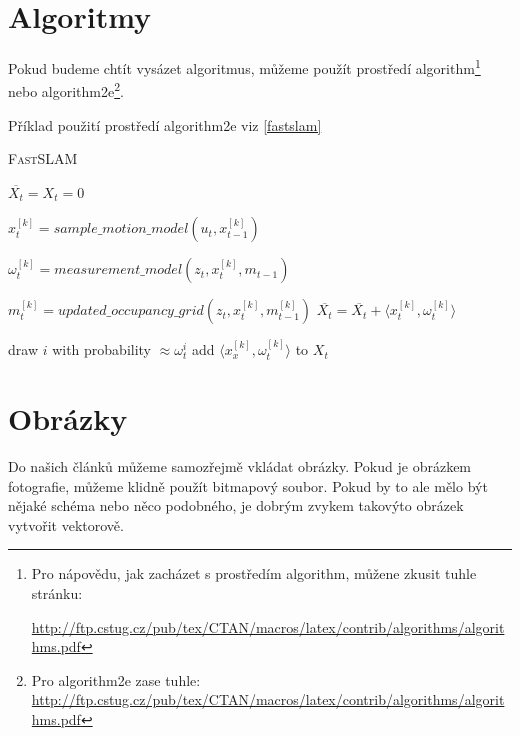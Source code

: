 \documentclass[a4paper,11pt,final]{article}
\begin{document}
\pagebreak



\section{Algoritmy}
\label{algos}

{\raggedright
Pokud budeme chtít vysázet algoritmus, můžeme použít prostředí {\ttfamily algorithm}\footnote{Pro nápovědu, jak zacházet s prostředím {\ttfamily algorithm}, můžene zkusit tuhle stránku: \raggedright{
\url{http://ftp.cstug.cz/pub/tex/CTAN/macros/latex/contrib/algorithms/algorithms.pdf}}} nebo {\ttfamily algorithm2e}\footnote{Pro {\ttfamily algorithm2e} zase tuhle: \url{http://ftp.cstug.cz/pub/tex/CTAN/macros/latex/contrib/algorithms/algorithms.pdf}}.
 
Příklad použití prostředí  {\ttfamily algorithm2e} viz \autoref{fastslam}}
\IncMargin{1.5em}
\begin{algorithm}[h]
	\caption{\textsc{FastSLAM}}
	\label{fastslam}
	\DontPrintSemicolon
	\SetAlgoLongEnd
	\SetAlgoNoLine
	\Indm\Indm
	\BlankLine
	\Indp\Indp
	$\overline{X_t} = X_t = 0$\;
	{
		$x^{[k]}_{t} = sample\_motion\_model(u_t,x_{t-1}^{[k]})$\;
		
		$\omega^{[k]}_{t} = measurement\_model(z_t,x^{[k]}_{t}, m_{t-1})$\;
		
		$m^{[k]}_{t} = updated\_occupancy\_grid(z_t, x^{[k]}_{t},m_{t-1}^{[k]})$\;
		$\overline{X_t} = \overline{X_t} + \langle x^{[k]}_{t}, \omega^{[k]}_{t} \rangle$
	}	
	{
		draw $i$ with probability $\approx \omega^{i}_t$\;
		add $\langle x^{[k]}_{x}, \omega^{[k]}_{t} \rangle$ to $X_t$\;
	}

\end{algorithm}
\DecMargin{1.5em}

\section{Obrázky}

Do našich článků můžeme samozřejmě vkládat obrázky. Pokud je obrázkem fotografie, můžeme klidně použít bitmapový soubor. Pokud by to ale mělo být nějaké schéma nebo něco podobného, je dobrým zvykem takovýto obrázek vytvořit vektorově.
\end{document}
